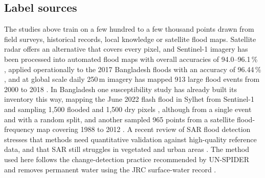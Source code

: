 \documentclass[10pt,a4paper,twocolumn]{article}
\begin{document}
\subsection{Label sources}

The studies above train on a few hundred to a few thousand points drawn from field surveys, historical records, local knowledge or satellite flood maps. Satellite radar offers an alternative that covers every pixel, and Sentinel-1 imagery has been processed into automated flood maps with overall accuracies of 94.0--96.1\,\% \citep{twele2016}, applied operationally to the 2017 Bangladesh floods with an accuracy of 96.44\,\% \citep{uddin2019}, and at global scale daily 250\,m imagery has mapped 913 large flood events from 2000 to 2018 \citep{tellman2021}. In Bangladesh one susceptibility study has already built its inventory this way, mapping the June 2022 flash flood in Sylhet from Sentinel-1 and sampling 1,500 flooded and 1,500 dry pixels \citep{islamr2024}, although from a single event and with a random split, and another sampled 965 points from a satellite flood-frequency map covering 1988 to 2012 \citep{adnan2023}. A recent review of SAR flood detection stresses that methods need quantitative validation against high-quality reference data, and that SAR still struggles in vegetated and urban areas \citep{amitrano2024}. The method used here follows the change-detection practice recommended by UN-SPIDER \citep{unspider} and removes permanent water using the JRC surface-water record \citep{pekel2016}.
\end{document}
